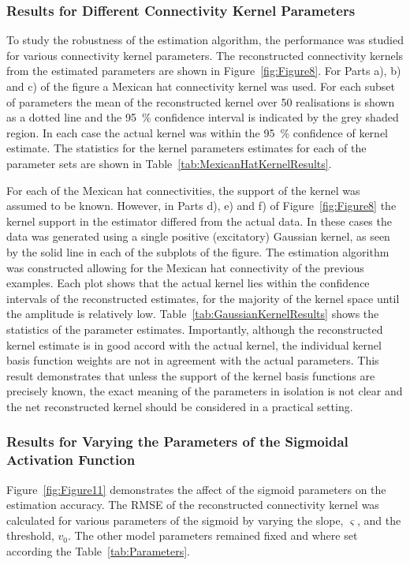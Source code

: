 \documentclass[12pt]{iopart}
\begin{document}
\subsubsection{Results for Different Connectivity Kernel Parameters}

To study the robustness of the estimation algorithm, the performance was studied for various connectivity kernel parameters. The reconstructed connectivity kernels from the estimated parameters are shown in Figure~\ref{fig:Figure8}. For Parts a), b) and c) of the figure a Mexican hat connectivity kernel was used. For each subset of parameters the mean of the reconstructed kernel over 50 realisations is shown as a dotted line and the 95~\% confidence interval is indicated by the grey shaded region. In each case the actual kernel was within the 95~\% confidence of kernel estimate. The statistics for the kernel parameters estimates for each of the parameter sets are shown in Table~\ref{tab:MexicanHatKernelResults}.

For each of the Mexican hat connectivities, the support of the kernel was assumed to be known. However, in Parts d), e) and f) of Figure~\ref{fig:Figure8} the kernel support in the estimator differed from the actual data. In these cases the data was generated using a single positive (excitatory) Gaussian kernel, as seen by the solid line in each of the subplots of the figure. The estimation algorithm was constructed allowing for the Mexican hat connectivity of the previous examples. Each plot shows that the actual kernel lies within the confidence intervals of the reconstructed estimates, for the majority of the kernel space until the amplitude is relatively low. Table~\ref{tab:GaussianKernelResults} shows the statistics of the parameter estimates. Importantly, although the reconstructed kernel estimate is in good accord with the actual kernel, the individual kernel basis function weights are not in agreement with the actual parameters. This result demonstrates that unless the support of the kernel basis functions are precisely known, the exact meaning of the parameters in isolation is not clear and the net reconstructed kernel should be considered in a practical setting.

\subsubsection{Results for Varying the Parameters of the Sigmoidal Activation Function}

Figure~\ref{fig:Figure11} demonstrates the affect of the sigmoid parameters on the estimation accuracy. The RMSE of the reconstructed connectivity kernel was calculated for various parameters of the sigmoid by varying the slope, $\varsigma$, and the threshold, $v_0$. The other model parameters remained fixed and where set according the Table~\ref{tab:Parameters}.
\end{document}
